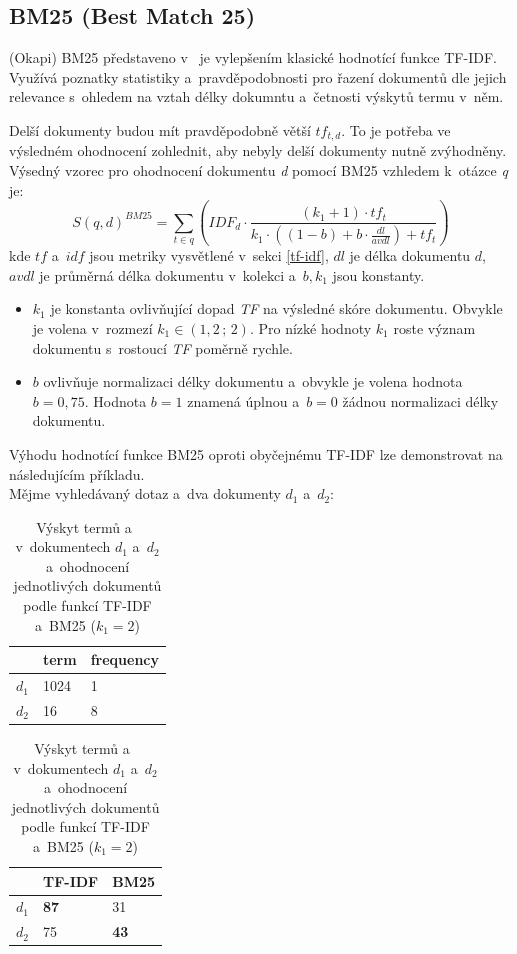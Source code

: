 \subsection{BM25 (Best Match 25)}
\label{bm25}
(Okapi) BM25 představeno v~\cite{bm25} je vylepšením klasické hodnotící funkce TF-IDF. Využívá poznatky statistiky a~pravděpodobnosti pro řazení dokumentů dle jejich relevance s~ohledem na vztah délky dokumntu a~četnosti výskytů termu v~něm.\par
Delší dokumenty budou mít pravděpodobně větší $tf_{t,d}$. To je potřeba ve výsledném ohodnocení zohlednit, aby nebyly delší dokumenty nutně zvýhodněny.
Výsedný vzorec pro ohodnocení dokumentu \emph{d} pomocí BM25 vzhledem k~otázce \emph{q} je:
\begin{equation}
    S(q,d)^{BM25} = \sum_{t \in q} \left(IDF_d \cdot \frac{(k_1+1)\cdot tf_t}{k_1\cdot ((1-b)+b \cdot \frac{dl}{avdl}) + tf_t}\right)
\end{equation}
kde $tf$ a~$idf$ jsou metriky vysvětlené v~sekci \ref{tf-idf}, $dl$ je délka dokumentu $d$, $avdl$ je průměrná délka dokumentu v~kolekci a~$b,k_1$ jsou konstanty.
\begin{itemize}
    \item $k_1$ je konstanta ovlivňující dopad \emph{TF} na výsledné skóre dokumentu. Obvykle je volena v~rozmezí $k_1\in(1,2\,;\,2)$. Pro nízké hodnoty $k_1$ roste význam dokumentu s~rostoucí \emph{TF} poměrně rychle.
    \item $b$ ovlivňuje normalizaci délky dokumentu a~obvykle je volena hodnota $b=0,75$. Hodnota $b=1$ znamená úplnou a~$b=0$ žádnou normalizaci délky dokumentu.
\end{itemize}

Výhodu hodnotící funkce BM25 oproti obyčejnému TF-IDF lze demonstrovat na následujícím příkladu.\\ \medskip
Mějme vyhledávaný dotaz  a~dva dokumenty $d_1$ a~$d_2$:\par

\begin{table}[H]
\centering
\begin{tabular}{|c|l|l|}
\hline
      & term & frequency \\ \hline
$d_1$ & 1024 & 1         \\ \hline
$d_2$ & 16   & 8         \\ \hline
\end{tabular}
\begin{tabular}{|c|l|l|}
\hline
      & \textbf{TF-IDF} & \textbf{BM25} \\ \hline
$d_1$ & \textbf{87} & 31         \\ \hline
$d_2$ & 75 & \textbf{43}         \\ \hline
\end{tabular}
\caption{Výskyt termů  a~ v~dokumentech $d_1$ a~$d_2$ a~ohodnocení jednotlivých dokumentů podle funkcí TF-IDF a~BM25 ($k_1 = 2$)}
\label{tab:tf}
\end{table}

